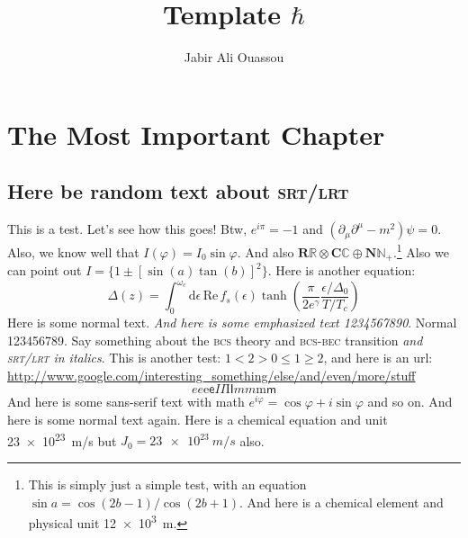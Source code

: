 \documentclass[b5paper,twoside,openright]{scrbook}
\title{Template $\hbar$}
\author{Jabir Ali Ouassou}
\begin{document}
\maketitle %
\frontmatter
\tableofcontents
\mainmatter 

\chapter{The Most Important Chapter}
\section{Here be random text about \textsc{srt/lrt}}
This is a test. Let's see how this goes! Btw, $e^{i\pi} = -1$ and $(\partial_\mu \partial^\mu - m^2) \psi = 0$.
Also, we know well that $I(\varphi) = I_0 \sin \varphi$.  And also $\mathbf{R}\mathbb{R} \otimes \mathbf{C}\mathbb{C} \oplus \mathbf{N}\mathbb{N}_+$.\footnote{This is simply just a simple test, with an equation $\sin a = \cos(2b-1)/\cos(2b+1)$. And here is a chemical element  and physical unit \SI{12e3}{m}.}
Also we can point out $I = \{ 1 \pm [\sin(a)\tan(b)]^2\} $.
Here is another equation:
\begin{equation}
  \Delta(z) = \int_0^{\omega_c} \mathrm{d}\epsilon\,\mathrm{Re}\, f_s(\epsilon) \tanh\!\left(\frac{\pi}{2e^\gamma} \frac{\epsilon/\Delta_0}{T/T_c}\right)
\end{equation}
Here is some normal text. \textit{And here is some emphasized text 1234567890}. Normal 123456789. 
Say something about the \textsc{bcs} theory and \textsc{bcs-bec} transition \emph{and \textsc{srt/lrt} in italics}.
This is another test: $1 < 2 > 0 \leq 1 \geq 2$, and here is an url: \url{http://www.google.com/interesting_something/else/and/even/more/stuff}
\begin{equation}
  \textit{e}e\mathrm{e}\textsf{e}%
  \textit{I}I\mathrm{I}\textsf{I}%
  \textit{m}m\mathrm{m}\textsf{m}%
\end{equation}
\textsf{And here is some sans-serif text with math $e^{i\varphi}=\cos\varphi+i\sin\varphi$ and so on.} And here is some normal text again.
Here is a chemical equation  and unit \SI{23e23}{m/s} but $J_0 = \SI{23e23}{m/s}$ also.
\end{document}
